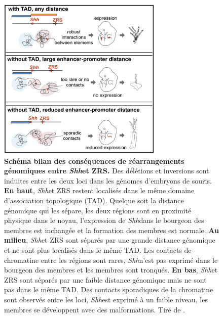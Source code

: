 \begin{figure}[h]
 \centering
 \includegraphics[width=0.7\textwidth, page=1] {figures/introduction/fig35.png}
 \caption[Schéma bilan des conséquences de réarrangements génomiques entre \textit{Shh} et ZRS.]{
 \textbf{Schéma bilan des conséquences de réarrangements génomiques entre \textit{Shh}et ZRS.}
 Des délétions et inversions sont induites entre les deux loci dans les génomes d'embryons de souris. \textbf{En haut}, \textit{Shh}et ZRS restent localisés dans le même domaine d'association topologique (TAD). Quelque soit la distance génomique qui les sépare, les deux régions sont en proximité physique dans le noyau, l'expression de \textit{Shh}dans le bourgeon des membres est inchangée et la formation des membres est normale. \textbf{Au milieu}, \textit{Shh}et ZRS sont séparés par une grande distance génomique et ne sont plus localisés dans le même TAD. Les contacts de chromatine entre les régions sont rares, \textit{Shh}n'est pas exprimé dans le bourgeon des membres et les membres sont tronqués. \textbf{En bas}, \textit{Shh}et ZRS sont séparés par une faible distance génomique mais ne sont pas dans le même TAD. Des contacts sporadiques de la chromatine sont observés entre les loci, \textit{Shh}est exprimé à un faible niveau, les membres se développent avec des malformations. 
 Tiré de \citet{symmons_SHH_2016}. \\
 }
 \label{fig:Fig35}
\end{figure}

